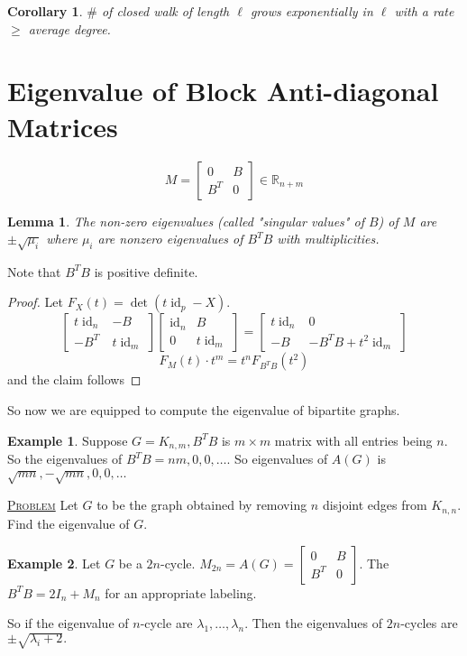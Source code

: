 \documentclass{report}
\newcommand{\R}{\mathbb{R}}
\def \id {\operatorname{id}}
\newcommand{\fancyem}[1]{\underline{\textsc{#1}}}
\newtheorem{corollary}{Corollary}[section]
\newtheorem{lemma}{Lemma}[section]
\theoremstyle{definition}
\newtheorem{example}{Example}[section]
\theoremstyle{remark}
\numberwithin{equation}{section}
\begin{document}
\begin{corollary} 
$\#$ of closed walk of length $\ell$ grows exponentially in $\ell$ with a rate $\geq$ average degree.
\end{corollary}


\section{Eigenvalue of Block Anti-diagonal Matrices}
\[M = \begin{bmatrix}
0 & B \\ B^{T} & 0
\end{bmatrix} \in \R_{n + m}\]

\begin{lemma}
The non-zero eigenvalues (called "singular values" of $B$) of $M$ are $\pm \sqrt{\mu_i}$ where $\mu_i$ are nonzero eigenvalues of $B^TB$ with multiplicities.
\end{lemma}
Note that $B^TB$ is positive definite.
\begin{proof} 
Let $F_X(t) = \det(t\id_p - X).$
\[
\begin{bmatrix}
t\id_n & -B \\
-B^T & t\id_m
\end{bmatrix}
\begin{bmatrix}
\id_n & B \\
0 & t\id_m
\end{bmatrix} = \begin{bmatrix}
t\id_n & 0 \\
-B & -B^TB + t^2\id_m
\end{bmatrix}
\]
\[
F_M(t) \cdot t^m = t^n F_{B^TB}(t^2)
\]
and the claim follows
\end{proof}

So now we are equipped to compute the eigenvalue of bipartite graphs.
\begin{example}
Suppose $G = K_{n, m}, B^TB$ is $m \times m$ matrix with all entries being $n$.
So the eigenvalues of $B^TB = nm, 0, 0, \ldots.$ So eigenvalues of $A(G)$ is $\sqrt{mn}, -\sqrt{mn}, 0, 0, \ldots$
\end{example}

\fancyem{Problem} Let $G$ to be the graph obtained by removing $n$ disjoint edges from $K_{n, n}.$ Find the eigenvalue of $G$.

\begin{example}
Let $G$ be a $2n$-cycle. $M_{2n} = A(G) = \begin{bmatrix}
0 & B \\ B^T & 0
\end{bmatrix}.$
The $B^TB = 2I_n + M_n$ for an appropriate labeling.

So if the eigenvalue of $n$-cycle are $\lambda_1, \ldots, \lambda_n.$ Then the eigenvalues of $2n$-cycles are $\pm\sqrt{\lambda_i + 2}.$
\end{example}
\end{document}

